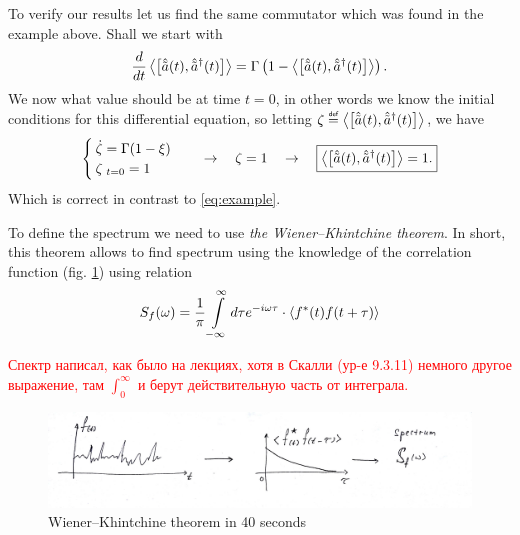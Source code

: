 To verify our results let us find the same commutator which was found in the example above. Shall we start with
\begin{equation}
	\frac{d}{dt} \left\langle {\left[ \hat{\tilde{a}}(t), \hat{\tilde{a}}^{\dagger}(t) \right]} \right\rangle = \Gamma \left( 1 - \left\langle {\left[ \hat{\tilde{a}}(t), \hat{\tilde{a}}^{\dagger}(t) \right]} \right\rangle \right).
\end{equation}
We now what value should be at time $t=0$, in other words we know the initial conditions for this differential equation, so letting $\zeta \myeq \av{\left[ \hat{\tilde{a}}(t), \hat{\tilde{a}}^{\dagger}(t) \right]}$, we have
\begin{equation}
	\begin{cases}
		\dot{\zeta} = \Gamma (1 - \xi) \\
		\zeta_{\ t=0} = 1
	\end{cases}
	\quad \to \quad \zeta = 1 \quad \to \quad \boxed{\left\langle {\left[ \hat{\tilde{a}}(t), \hat{\tilde{a}}^{\dagger}(t) \right]} \right\rangle = 1.}
\end{equation}
Which is correct in contrast to \eqref{eq:example}.

To define the spectrum we need to use \textit{the Wiener--Khintchine theorem}. In short, this theorem allows to find spectrum using the knowledge of the correlation function (fig. \ref{fig:wiener}) using relation
\begin{equation}
	S_f(\omega) = \frac{1}{\pi} \int \limits_{-\infty}^{\infty} d \tau e^{-i \omega \tau} \cdot \left\langle {f^*(t) f(t + \tau)} \right\rangle
\end{equation}
\begin{otherlanguage}{russian}	
	\textcolor{red}{Спектр написал, как было на лекциях, хотя в Скалли (ур-е 9.3.11) немного другое выражение, там $\int_0^{\infty}$ и берут действительную часть от интеграла.}
\end{otherlanguage}

\begin{figure}
	\centering
	\includegraphics[width=0.85\linewidth]{fig/L9/wiener}
	\caption{Wiener--Khintchine theorem in 40 seconds}
	\label{fig:wiener}
\end{figure}

